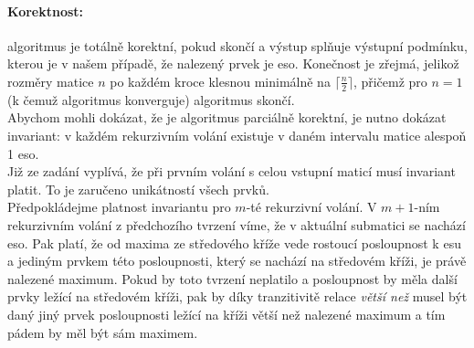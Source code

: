 \documentclass[12pt]{iv003}
\begin{document}
\paragraph{Korektnost:} algoritmus je totálně korektní, pokud skončí a výstup splňuje výstupní podmínku, kterou je v našem případě, že nalezený prvek je eso. Konečnost je zřejmá, jelikož rozměry matice $n$ po každém kroce klesnou minimálně na $\lceil \frac{n}{2} \rceil$, přičemž pro $n = 1$ (k čemuž algoritmus konverguje) algoritmus skončí.\\
Abychom mohli dokázat, že je algoritmus parciálně korektní, je nutno dokázat invariant: v každém rekurzivním volání existuje v daném intervalu matice alespoň 1 eso.\\
Již ze zadání vyplívá, že při prvním volání s celou vstupní maticí musí invariant platit. To je zaručeno unikátností všech prvků.\\
Předpokládejme platnost invariantu pro $m$-té rekurzivní volání. 
V $m+1$-ním rekurzivním volání z předchozího tvrzení víme, že v aktuální submatici se nachází eso. %
Pak platí, že od maxima ze středového kříže vede rostoucí posloupnost k esu a jediným prvkem této posloupnosti, který se nachází na středovém kříži, je právě nalezené maximum. Pokud by toto tvrzení neplatilo a posloupnost by měla další prvky ležící na středovém kříži, pak by díky tranzitivitě relace \textit{větší než} musel být daný jiný prvek posloupnosti ležící na kříži větší než nalezené maximum a tím pádem by měl být sám maximem.
\end{document}
